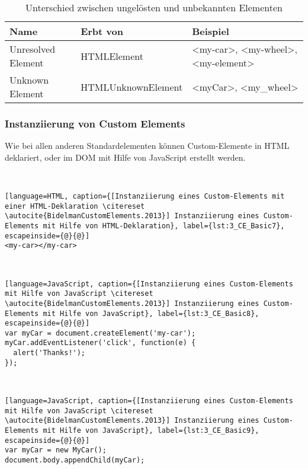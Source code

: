 \begin{table}[htbp]
\centering
\begin{tabular}{ M{3cm} | M{5cm} | M{5cm} }
Name & Erbt von & Beispiel \\
\hline
\hline
Unresolved Element & HTMLElement & <my-car>, <my-wheel>, <my-element>\\
\hline
Unknown Element & HTMLUnknownElement & <myCar>, <my\_wheel>\\
\end{tabular}
\caption[
Unterschied zwischen ungelösten und unbekannten Elementen \citereset \autocite{BidelmanCustomElements.2013}
]
{Unterschied zwischen ungelösten und unbekannten Elementen}
\label{tab:Unterschiede_Elemente}
\end{table}

\subsubsection{Instanziierung von Custom Elements}

Wie bei allen anderen Standardelementen können Custom-Elemente in HTML deklariert, oder im DOM mit Hilfe von JavaScript erstellt werden.


\begin{enumerate}
 \hfill \\
\begin{lstlisting}[language=HTML, caption={[Instanziierung eines Custom-Elements mit einer HTML-Deklaration \citereset \autocite{BidelmanCustomElements.2013}] Instanziierung eines Custom-Elements mit Hilfe von HTML-Deklaration}, label={lst:3_CE_Basic7}, escapeinside={@}{@}]
<my-car></my-car>
\end{lstlisting}

 \hfill \\
\begin{lstlisting}[language=JavaScript, caption={[Instanziierung eines Custom-Elements mit Hilfe von JavaScript \citereset \autocite{BidelmanCustomElements.2013}] Instanziierung eines Custom-Elements mit Hilfe von JavaScript}, label={lst:3_CE_Basic8}, escapeinside={@}{@}]
var myCar = document.createElement('my-car');
myCar.addEventListener('click', function(e) {
  alert('Thanks!');
});
\end{lstlisting}

 \hfill \\
\begin{lstlisting}[language=JavaScript, caption={[Instanziierung eines Custom-Elements mit Hilfe von JavaScript \citereset \autocite{BidelmanCustomElements.2013}] Instanziierung eines Custom-Elements mit Hilfe von JavaScript}, label={lst:3_CE_Basic9}, escapeinside={@}{@}]
var myCar = new MyCar();
document.body.appendChild(myCar);
\end{lstlisting}
\end{enumerate}

